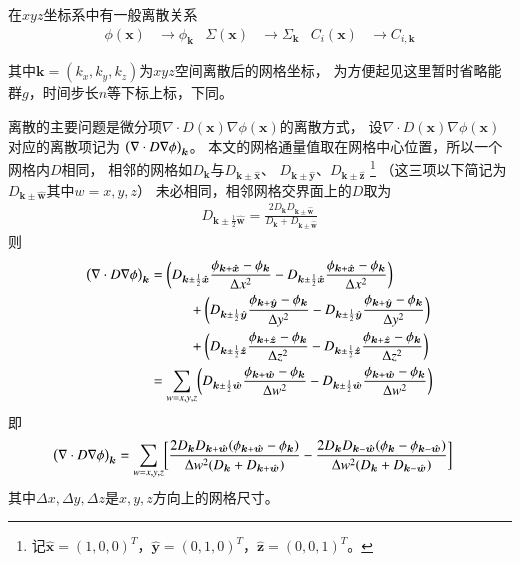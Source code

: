 在$xyz$坐标系中有一般离散关系
\begin{align}
  \phi(\bm{x}) &\rightarrow \phi_{\bm{k}} &
  \Sigma(\bm{x}) &\rightarrow \Sigma_{\bm{k}} &
  C_i(\bm{x}) &\rightarrow C_{i,\bm{k}}
\end{align}

其中$\bm{k}=(k_x,k_y,k_z)$为$xyz$空间离散后的网格坐标，
为方便起见这里暂时省略能群$g$，时间步长$n$等下标上标，下同。

离散的主要问题是微分项$\nabla\cdot D(\bm{x})\nabla\phi(\bm{x})$的离散方式，
设$\nabla\cdot D(\bm{x})\nabla\phi(\bm{x})$对应的离散项记为
$\pb[b]{\nabla\cdot D\nabla\phi}_{\bm{k}}$。
本文的网格通量值取在网格中心位置，所以一个网格内$D$相同，
相邻的网格如$D_{\bm{k}}$与$D_{\bm{k}\pm\hat{\bm{x}}}$、
$D_{\bm{k}\pm\hat{\bm{y}}}$、$D_{\bm{k}\pm\hat{\bm{z}}}$
\footnote{记$\hat{\bm{x}}=(1,0,0)^T$，$\hat{\bm{y}}=(0,1,0)^T$，$\hat{\bm{z}}=(0,0,1)^T$。}
（这三项以下简记为$D_{\bm{k}\pm\hat{\bm{w}}}$其中$w=x,y,z$）
未必相同，相邻网格交界面上的$D$取为
\begin{align}
D_{\bm{k}\pm\frac{1}{2}\hat{\bm{w}}}
  =\frac{2D_{\bm{k}}D_{\bm{k}\pm\hat{\bm{w}}}}{D_{\bm{k}}+D_{\bm{k}\pm\hat{\bm{w}}}}
\end{align}
则
\begin{align*}
\pb[b]{\nabla\cdot D\nabla\phi}_{\bm{k}}
 &= \pb[bg]{ D_{\bm{k}\pm\frac{1}{2}\hat{\bm{x}}}\frac{\phi_{\bm{k}+\hat{\bm{x}}} - \phi_{\bm{k}}}{\Delta x^2}
    -D_{\bm{k}\pm\frac{1}{2}\hat{\bm{x}}}\frac{\phi_{\bm{k}+\hat{\bm{x}}} - \phi_{\bm{k}}}{\Delta x^2}
    }\\
 &\hspace{1cm}+
    \pb[bg]{ D_{\bm{k}\pm\frac{1}{2}\hat{\bm{y}}}\frac{\phi_{\bm{k}+\hat{\bm{y}}} - \phi_{\bm{k}}}{\Delta y^2}
       -D_{\bm{k}\pm\frac{1}{2}\hat{\bm{y}}}\frac{\phi_{\bm{k}+\hat{\bm{y}}} - \phi_{\bm{k}}}{\Delta y^2}
       }\\
 &\hspace{1cm}+
    \pb[bg]{ D_{\bm{k}\pm\frac{1}{2}\hat{\bm{z}}}\frac{\phi_{\bm{k}+\hat{\bm{z}}} - \phi_{\bm{k}}}{\Delta z^2}
       -D_{\bm{k}\pm\frac{1}{2}\hat{\bm{z}}}\frac{\phi_{\bm{k}+\hat{\bm{z}}} - \phi_{\bm{k}}}{\Delta z^2}
       }\\
 &= \sum_{w=x,y,z} \pb[bg]{ D_{\bm{k}\pm\frac{1}{2}\hat{\bm{w}}}\frac{\phi_{\bm{k}+\hat{\bm{w}}} - \phi_{\bm{k}}}{\Delta w^2}
   -D_{\bm{k}\pm\frac{1}{2}\hat{\bm{w}}}\frac{\phi_{\bm{k}+\hat{\bm{w}}} - \phi_{\bm{k}}}{\Delta w^2}
   }
\end{align*}
即
\begin{align}
  \pb[b]{\nabla\cdot D\nabla\phi}_{\bm{k}}
    &=\sum_{w=x,y,z} \Sb[bg]{
           \frac{2D_{\bm{k}}D_{\bm{k}+\hat{\bm{w}}}\pb{\phi_{\bm{k}+\hat{\bm{w}}} - \phi_{\bm{k}}}}
                {\Delta w^2\pb{D_{\bm{k}}+D_{\bm{k}+\hat{\bm{w}}}}}
          -\frac{2D_{\bm{k}}D_{\bm{k}-\hat{\bm{w}}}\pb{\phi_{\bm{k}} - \phi_{\bm{k}-\hat{\bm{w}}}}}
                {\Delta w^2\pb{D_{\bm{k}}+D_{\bm{k}-\hat{\bm{w}}}}}
          }
  \label{equ:dnabla2.equ0}
\end{align}
其中$\Delta x,\Delta y,\Delta z$是$x,y,z$方向上的网格尺寸。

